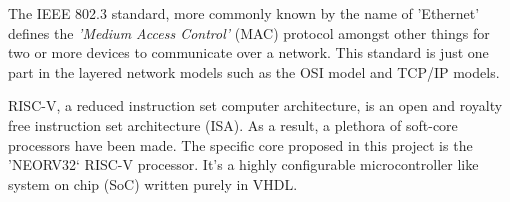 The IEEE 802.3 standard\cite{IEEE802.3-2012}, more commonly known by the name of 'Ethernet' defines the \textit{'Medium Access Control'} (MAC) 
protocol amongst other things for two or more devices to communicate over a network. This standard is just one part in the layered network 
models such as the OSI model and TCP/IP models. 


RISC-V, a reduced instruction set computer architecture, is an open and royalty free instruction set architecture (ISA). As a result, a plethora 
of soft-core processors have been made. The specific core proposed in this project is the 'NEORV32` RISC-V processor. It's a highly configurable 
microcontroller like system on chip (SoC) written purely in VHDL.

